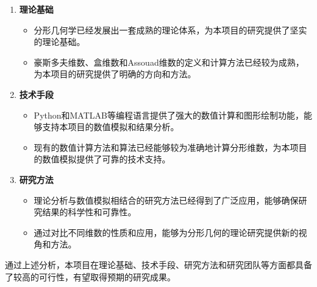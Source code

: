 \begin{enumerate}
      \item \textbf{理论基础}
      \begin{itemize}
            \item 分形几何学已经发展出一套成熟的理论体系，为本项目的研究提供了坚实的理论基础。
            \item 豪斯多夫维数、盒维数和Assouad维数的定义和计算方法已经较为成熟，为本项目的研究提供了明确的方向和方法。
      \end{itemize}
      \item \textbf{技术手段}
      \begin{itemize}
            \item Python和MATLAB等编程语言提供了强大的数值计算和图形绘制功能，能够支持本项目的数值模拟和结果分析。
            \item 现有的数值计算方法和算法已经能够较为准确地计算分形维数，为本项目的数值模拟提供了可靠的技术支持。
      \end{itemize}
      \item \textbf{研究方法}
      \begin{itemize}
            \item 理论分析与数值模拟相结合的研究方法已经得到了广泛应用，能够确保研究结果的科学性和可靠性。
            \item 通过对比不同维数的性质和应用，能够为分形几何的理论研究提供新的视角和方法。
      \end{itemize}

\end{enumerate}
\nocite{1}
\nocite{2}
\nocite{3}
\nocite{4}
通过上述分析，本项目在理论基础、技术手段、研究方法和研究团队等方面都具备了较高的可行性，有望取得预期的研究成果。